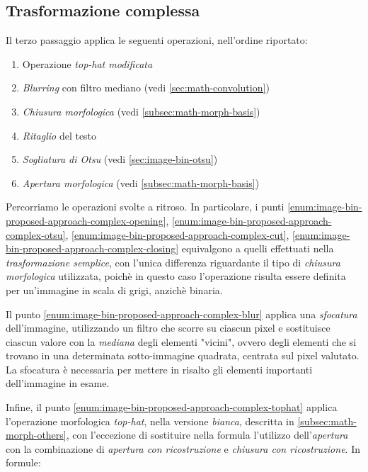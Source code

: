 \subsection{Trasformazione complessa}
\label{subsec:image-bin-proposed-approach-complex}
Il terzo passaggio applica le seguenti operazioni, nell'ordine riportato:
\begin{enumerate}
	\item\label{enum:image-bin-proposed-approach-complex-tophat} Operazione \textit{top-hat modificata}
	\item\label{enum:image-bin-proposed-approach-complex-blur} \textit{Blurring} con filtro mediano (vedi \ref{sec:math-convolution})
	\item\label{enum:image-bin-proposed-approach-complex-closing} \textit{Chiusura morfologica} (vedi \ref{subsec:math-morph-basis})
	\item\label{enum:image-bin-proposed-approach-complex-cut} \textit{Ritaglio} del testo
	\item \label{enum:image-bin-proposed-approach-complex-otsu} \textit{Sogliatura di Otsu} (vedi \ref{sec:image-bin-otsu})
	\item\label{enum:image-bin-proposed-approach-complex-opening} \textit{Apertura morfologica} (vedi \ref{subsec:math-morph-basis})
\end{enumerate}
Percorriamo le operazioni svolte a ritroso. In particolare, i punti \ref{enum:image-bin-proposed-approach-complex-opening}, \ref{enum:image-bin-proposed-approach-complex-otsu}, \ref{enum:image-bin-proposed-approach-complex-cut}, \ref{enum:image-bin-proposed-approach-complex-closing} equivalgono a quelli effettuati nella \textit{trasformazione semplice}, con l'unica differenza riguardante il tipo di \textit{chiusura morfologica} utilizzata, poich\`e in questo caso l'operazione risulta essere definita per un'immagine in scala di grigi, anzich\`e binaria.\par
Il punto \ref{enum:image-bin-proposed-approach-complex-blur} applica una \textit{sfocatura} dell'immagine, utilizzando un filtro che scorre su ciascun pixel e sostituisce ciascun valore con la \textit{mediana} degli elementi "vicini", ovvero degli elementi che si trovano in una determinata sotto-immagine quadrata, centrata sul pixel valutato. La sfocatura \`e necessaria per mettere in risalto gli elementi importanti dell'immagine in esame.\par
Infine, il punto \ref{enum:image-bin-proposed-approach-complex-tophat} applica l'operazione morfologica \textit{top-hat}, nella versione \textit{bianca}, descritta in \ref{subsec:math-morph-others}, con l'eccezione di sostituire nella formula l'utilizzo dell'\textit{apertura} con la combinazione di \textit{apertura con ricostruzione} e \textit{chiusura con ricostruzione}\cite{bib:top-hat-paper}. In formule:
